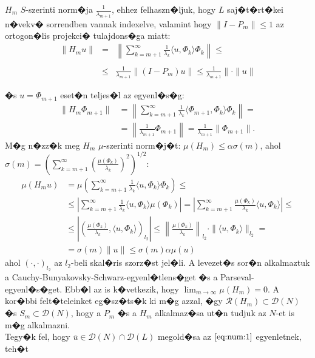 $H_m$ $S$-szerinti norm�ja $\frac{1}{\lambda_{m+1}}$, ehhez felhaszn�ljuk, hogy $L$ saj�t�rt�kei n�vekv� sorrendben vannak indexelve, valamint hogy $\|I - P_m\| \leq 1$ az ortogon�lis projekci� tulajdons�ga miatt:
$$
\begin{array}{lll}
  \displaystyle\|H_m u\| & = & \displaystyle \left\|\sum_{k=m+1}^\infty\frac{1}{\lambda_k}\langle u,\Phi_k\rangle\Phi_k\right\| \leq \\\\
    & \leq & \displaystyle\frac{1}{\lambda_{m+1}}\|(I-P_m)u\|\leq\frac{1}{\lambda_{m+1}}\|\cdot \|u\|
\end{array}
$$

�s $u = \Phi_{m+1}$ eset�n teljes�l az egyenl�s�g:
\begin{align*}
\|H_m \Phi_{m+1}\| &= \left\| \sum_{k = m+1}^\infty \frac{1}{\lambda_k} \langle \Phi_{m+1}, \Phi_k \rangle \Phi_k\right\| = \\
 &= \left\| \frac{1}{\lambda_{m+1}} \Phi_{m+1}\right\| = \frac{1}{\lambda_{m+1}} \|\Phi_{m+1}\|.
\end{align*}
M�g n�zz�k meg $H_m$ $\mu$-szerinti norm�j�t: $\mu(H_m) \leq \alpha \sigma(m)$, ahol $\sigma(m) = \left(\sum_{k = m+1}^\infty \left( \frac{\mu(\Phi_k)}{\lambda_k}\right)^2\right)^{1/2}$:
\begin{align*}
\mu(H_m u) &= \mu \left( \sum_{k = m+1}^\infty \frac{1}{\lambda_k} \langle u, \Phi_k \rangle \Phi_k \right) \leq \\
 &\leq \left| \sum_{k = m+1}^\infty \frac{1}{\lambda_k} \langle u, \Phi_k \rangle \mu(\Phi_k) \right| = \left| \sum_{k = m+1}^\infty \frac{\mu(\Phi_k)}{\lambda_k} \langle u, \Phi_k \rangle \right| \leq \\
 &\leq \left| \left( \frac{\mu(\Phi_k)}{\lambda_k}, \langle u, \Phi_k \rangle \right)_{l_2}\right| \leq \left\|\frac{\mu(\Phi_k)}{\lambda_k}\right\|_{l_2} \cdot\|\langle u, \Phi_k \rangle\|_{l_2} = \\
 &= \sigma(m)\|u\| \leq \sigma(m) \alpha \mu(u)
\end{align*}
ahol $\left( \cdot, \cdot \right)_{l_2}$ az $l_2$-beli skal�ris szorz�st jel�li. A levezet�s sor�n alkalmaztuk a Cauchy-Bunyakovsky-Schwarz-egyenl�tlens�get �s a Parseval-egyenl�s�get.
Ebb�l az is k�vetkezik, hogy $\lim_{m \to \infty} \mu(H_m) = 0$. A kor�bbi felt�teleinket eg�sz�ts�k ki m�g azzal, �gy $\mathcal{R}(H_m) \subset \mathcal{D}(N)$ �s $S_m \subset \mathcal{D}(N)$, hogy a $P_m$ �s a $H_m$ alkalmaz�sa ut�n tudjuk az $N$-et is m�g alkalmazni. \\
Tegy�k fel, hogy $\overline{u} \in \mathcal{D}(N) \cap \mathcal{D}(L)$ megold�sa az $\eqref{eq:num:1}$ egyenletnek, teh�t
